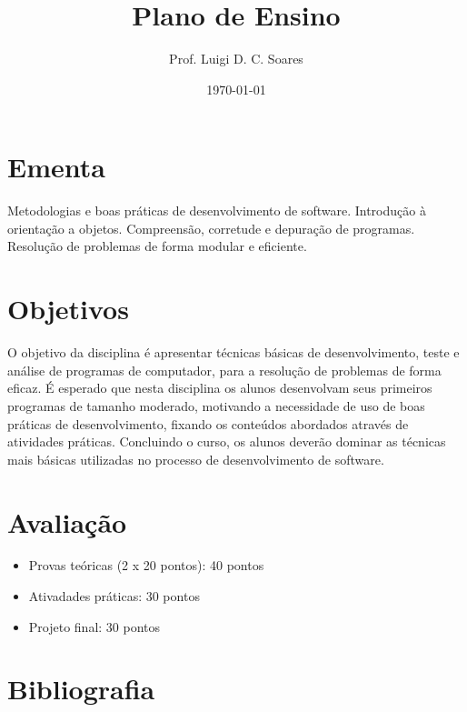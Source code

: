 \documentclass[11pt]{article}
\author{Prof. Luigi D. C. Soares}
\date{\today}
\title{Plano de Ensino}
\begin{document}
\begin{center}
    \Large\bfseries\thetitle{}
\end{center}

\section{Ementa}
\label{sec:org617f884}

Metodologias e boas práticas de desenvolvimento de
software. Introdução à orientação a objetos.  Compreensão,
corretude e depuração de programas. Resolução de problemas
de forma modular e eficiente.

\section{Objetivos}
\label{sec:orgfe7f74a}

O objetivo da disciplina é apresentar técnicas básicas de
desenvolvimento, teste e análise de programas de computador,
para a resolução de problemas de forma eficaz. É esperado
que nesta disciplina os alunos desenvolvam seus primeiros
programas de tamanho moderado, motivando a necessidade de
uso de boas práticas de desenvolvimento, fixando os
conteúdos abordados através de atividades
práticas. Concluindo o curso, os alunos deverão dominar as
técnicas mais básicas utilizadas no processo de
desenvolvimento de software.

\section{Avaliação}
\label{sec:orgb18bddc}

\begin{itemize}
\item Provas teóricas (2 x 20 pontos): 40 pontos
\item Ativadades práticas: 30 pontos
\item Projeto final: 30 pontos
\end{itemize}

\section{Bibliografia}
\label{sec:org7285a46}

\nocite{*}
\printbibliography[heading=none]
\end{document}
